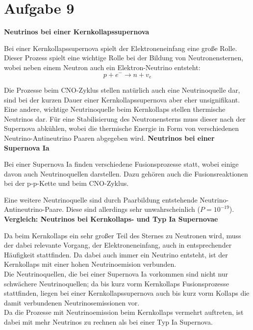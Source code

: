 \documentclass[11pt a4paper]{article}
\begin{document}
\thispagestyle{fancy}
\section*{Aufgabe 9}
\textbf{Neutrinos bei einer Kernkollapssupernova} \newline

Bei einer Kernkollapssupernova spielt der Elektroneneinfang eine große
Rolle. Dieser Prozess spielt eine wichtige Rolle bei der Bildung von 
Neutronensternen, wobei neben einem Neutron auch ein Elektron-Neutrino 
entsteht:
\[
	p + e^- \rightarrow n + v_e
\]

Die Prozesse beim CNO-Zyklus stellen natürlich auch eine Neutrinoquelle dar,
sind bei der kurzen Dauer einer Kernkollapssupernova aber eher unsignifikant.\\

Eine andere, wichtige Neutrinoquelle beim Kernkollaps stellen thermische 
Neutrinos dar. Für eine Stabilisierung des Neutronensterns muss dieser nach
der Supernova abkühlen, wobei die thermische Energie in Form von 
verschiedenen Neutrino-Antineutrino Paaren abgegeben wird.
\newline
\vspace{0.5cm}
\newline
\textbf{Neutrinos bei einer Supernova Ia}

Bei einer Supernova Ia finden verschiedene Fusionsprozesse statt, wobei 
einige davon auch Neutrinoquellen darstellen. Dazu gehören auch die 
Fusionsreaktionen bei der p-p-Kette und beim CNO-Zyklus.

Eine weitere Neutrinoquelle sind durch Paarbildung entstehende 
Neutrino-Antineutrino-Paare. Diese sind allerdings sehr unwahrscheinlich 
($P = 10^{-19}$).
\newline
\vspace{0.5cm}
\newline
\textbf{Vergleich: Neutrinos bei Kernkollaps- und Typ Ia Supernovae}

Da beim Kernkollaps ein sehr großer Teil des Sternes zu Neutronen wird, 
muss der dabei relevante Vorgang, der Elektroneneinfang, auch in 
entsprechender Häufigkeit stattfinden. Da dabei auch immer ein Neutrino 
entsteht, ist der Kernkollaps mit einer hohen Neutrinoemision verbunden.
\\
Die Neutrinoquellen, die bei einer Supernova Ia vorkommen sind nicht 
nur schwächere 
Neutrinoquellen; da bis kurz vorm Kernkollaps Fusionsprozesse stattfinden,
liegen bei einer Kernkollapssupernova auch bis kurz vorm Kollaps die damit 
verbundenen Neutrinosemissionen vor.
\\
Da die Prozesse mit Neutrinoemission beim Kernkollaps vermehrt auftreten,
ist dabei mit mehr Neutrinos zu rechnen als bei einer Typ Ia Supernova.
\end{document}
